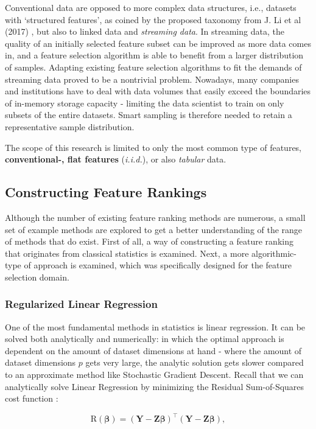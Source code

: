 \documentclass{article}
\begin{document}
Conventional data are opposed to more complex data structures, i.e., datasets with `structured features', as coined by the proposed taxonomy from J. Li et al (2017) \cite{li_feature_2017}, but also to linked data and \textit{streaming data}. In streaming data, the quality of an initially selected feature subset can be improved as more data comes in, and a feature selection algorithm is able to benefit from a larger distribution of samples. Adapting existing feature selection algorithms to fit the demands of streaming data proved to be a nontrivial problem. Nowadays, many companies and institutions have to deal with data volumes that easily exceed the boundaries of in-memory storage capacity - limiting the data scientist to train on only subsets of the entire datasets. Smart sampling is therefore needed to retain a representative sample distribution.

The scope of this research is limited to only the most common type of features, \textbf{conventional-, flat features} (\textit{i.i.d.}), or also \textit{tabular} data.

\subsection{Constructing Feature Rankings}
Although the number of existing feature ranking methods are numerous, a small set of example methods are explored to get a better understanding of the range of methods that do exist. First of all, a way of constructing a feature ranking that originates from classical statistics is examined. Next, a more algorithmic-type of approach is examined, which was specifically designed for the feature selection domain.

\subsubsection{Regularized Linear Regression}\label{section:ridge-regression}
One of the most fundamental methods in statistics is linear regression. It can be solved both analytically and numerically: in which the optimal approach is dependent on the amount of dataset dimensions at hand - where the amount of dataset dimensions $p$ gets very large, the analytic solution gets slower compared to an approximate method like Stochastic Gradient Descent. Recall that we can analytically solve Linear Regression by minimizing the Residual Sum-of-Squares cost function \citep{hastie_elements_2009}:

\begin{equation}\text{R}(\boldsymbol{\beta}) = (\mathbf{Y} - \mathbf{Z} \boldsymbol{\beta})^\intercal (\mathbf{Y} - \mathbf{Z} \boldsymbol{\beta}),\end{equation}
\end{document}
